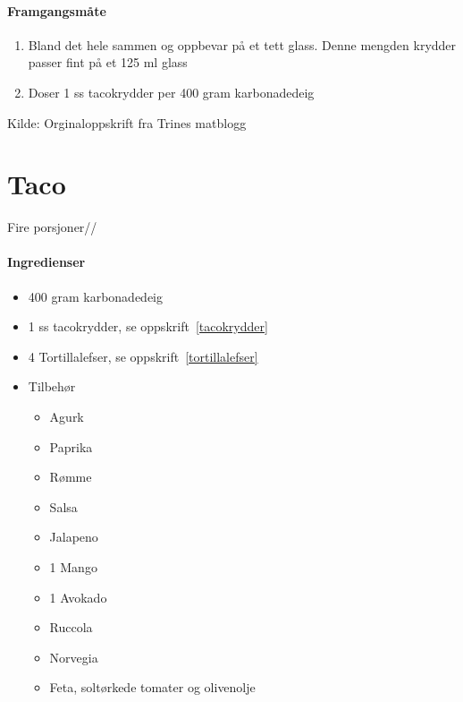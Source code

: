 \documentclass[12pt,a4paper]{book}
\begin{document}
\paragraph{Framgangsmåte}
\begin{enumerate}[noitemsep]
	\item Bland det hele sammen og oppbevar på et tett glass. Denne mengden krydder passer fint på et 125 ml glass
	\item Doser 1 ss tacokrydder per 400 gram karbonadedeig
\end{enumerate}

Kilde: Orginaloppskrift fra Trines matblogg



\clearpage{}
\clearpage{}\section{﻿Taco}
\label{taco}

Fire porsjoner//

\paragraph{Ingredienser}
\begin{itemize}[noitemsep]
	\item 400 gram karbonadedeig
	\item 1 ss tacokrydder, se oppskrift~\ref{tacokrydder}
	\item 4 Tortillalefser, se oppskrift~\ref{tortillalefser}
	\item Tilbehør
		\begin{itemize}[noitemsep]
			\item Agurk
			\item Paprika
			\item Rømme
			\item Salsa
			\item Jalapeno
			\item 1 Mango
			\item 1 Avokado
			\item Ruccola
			\item Norvegia
			\item Feta, soltørkede tomater og olivenolje
			\end{itemize}
\end{itemize}
\end{document}
